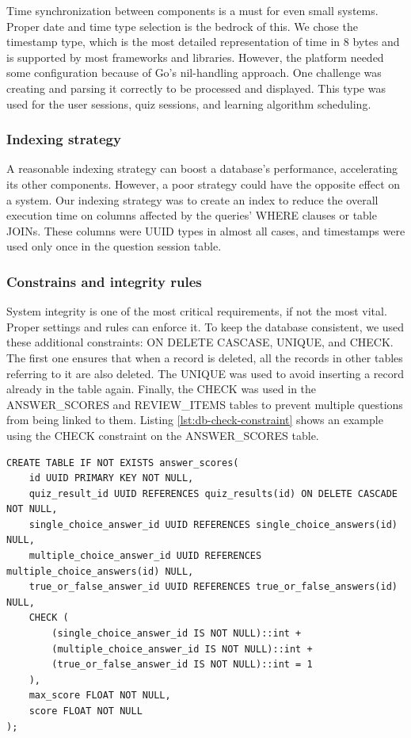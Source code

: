 Time synchronization between components is a must for even small systems. Proper date and time type selection is the bedrock of this. We chose the timestamp type, which is the most detailed representation of time in 8 bytes and is supported by most frameworks and libraries. However, the platform needed some configuration because of Go's nil-handling approach. One challenge was creating and parsing it correctly to be processed and displayed. This type was used for the user sessions, quiz sessions, and learning algorithm scheduling.

\subsubsection{Indexing strategy}

A reasonable indexing strategy can boost a database's performance, accelerating its other components. However, a poor strategy could have the opposite effect on a system. Our indexing strategy was to create an index to reduce the overall execution time on columns affected by the queries' WHERE clauses or table JOINs. These columns were UUID types in almost all cases, and timestamps were used only once in the question session table.

\subsubsection{Constrains and integrity rules}

System integrity is one of the most critical requirements, if not the most vital. Proper settings and rules can enforce it. To keep the database consistent, we used these additional constraints: ON DELETE CASCASE, UNIQUE, and CHECK. The first one ensures that when a record is deleted, all the records in other tables referring to it are also deleted. The UNIQUE was used to avoid inserting a record already in the table again. Finally, the CHECK was used in the ANSWER\_SCORES and REVIEW\_ITEMS tables to prevent multiple questions from being linked to them. Listing \ref{lst:db-check-constraint} shows an example using the CHECK constraint on the ANSWER\_SCORES table.

\begin{lstlisting}[caption=Using CHECK constraint,label=lst:db-check-constraint, float]
CREATE TABLE IF NOT EXISTS answer_scores(
    id UUID PRIMARY KEY NOT NULL,
    quiz_result_id UUID REFERENCES quiz_results(id) ON DELETE CASCADE NOT NULL,
    single_choice_answer_id UUID REFERENCES single_choice_answers(id) NULL,
    multiple_choice_answer_id UUID REFERENCES multiple_choice_answers(id) NULL,
    true_or_false_answer_id UUID REFERENCES true_or_false_answers(id) NULL,
    CHECK (
        (single_choice_answer_id IS NOT NULL)::int +
        (multiple_choice_answer_id IS NOT NULL)::int +
        (true_or_false_answer_id IS NOT NULL)::int = 1
    ),
    max_score FLOAT NOT NULL,
    score FLOAT NOT NULL
);
\end{lstlisting}

